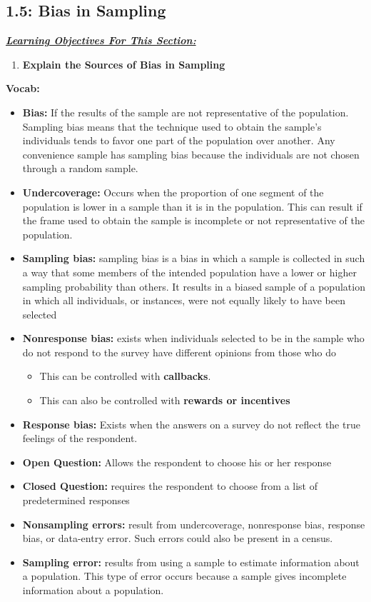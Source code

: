 \documentclass{report}
\begin{document}
        \subsection{1.5: Bias in Sampling}
        \bigbreak \noindent 
        \textbf{\textit{\underline{Learning Objectives For This Section:}}}
        \begin{enumerate}
            \item \textbf{Explain the Sources of Bias in Sampling}
        \end{enumerate}
        \bigbreak \noindent 
        \textbf{Vocab:}
        \begin{itemize}
            \item \textbf{Bias:} If the results of the sample are not representative of the population. Sampling bias means that the technique used to obtain the sample's individuals tends to favor one part of the  population over another. Any convenience sample has sampling bias because the individuals are not chosen through a random sample.
            \item \textbf{Undercoverage:} Occurs when the proportion of one segment of the population is lower in a sample than it is in the population. This can result if the frame used to obtain the sample is incomplete or not representative of the population.
            \item \textbf{Sampling bias:} sampling bias is a bias in which a sample is collected in such a way that some members of the intended population have a lower or higher sampling probability than others. It results in a biased sample of a population in which all individuals, or instances, were not equally likely to have been selected
            \item \textbf{Nonresponse bias:} exists when individuals selected to be in the sample who do not respond to the survey have different opinions from those who do
                \begin{itemize}
                    \item This can be controlled with \textbf{callbacks}.
                    \item This can also be controlled with \textbf{rewards or incentives}
                \end{itemize}
            \item \textbf{Response bias:} Exists when the answers on a survey do not reflect the true feelings of the respondent.
            \item \textbf{Open Question:} Allows the respondent to choose his or her response
            \item \textbf{Closed Question:} requires the respondent to choose from a list of predetermined responses
            \item \textbf{Nonsampling errors:} result from undercoverage, nonresponse bias, response bias, or data-entry error. Such errors could also be present in a census.
            \item \textbf{Sampling error:} results from using a sample to estimate information about a population. This type of error occurs because a sample gives incomplete information about a population.
        \end{itemize}
\end{document}
